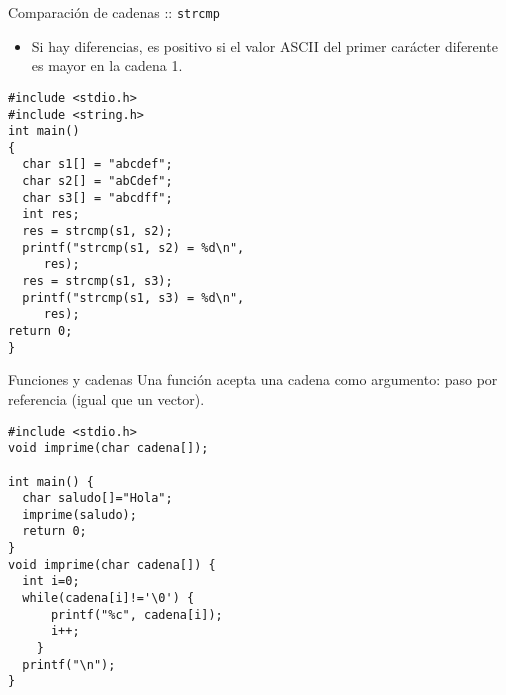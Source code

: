\documentclass[xcolor={usenames,svgnames,dvipsnames}, aspectratio=169]{beamer}
\begin{document}
\begin{frame}[label={sec:orgc81d6ae},fragile]{Comparación de cadenas :: \texttt{strcmp}}
 \begin{itemize}
\item Si hay diferencias, es positivo si el valor ASCII del primer carácter diferente es mayor en la cadena 1.
\end{itemize}

\lstset{language=C,label= ,caption= ,captionpos=b,numbers=none}
\begin{lstlisting}
#include <stdio.h>
#include <string.h>
int main()
{
  char s1[] = "abcdef";
  char s2[] = "abCdef";
  char s3[] = "abcdff";
  int res;
  res = strcmp(s1, s2);
  printf("strcmp(s1, s2) = %d\n",
	 res);
  res = strcmp(s1, s3);
  printf("strcmp(s1, s3) = %d\n",
	 res);
return 0;
}
\end{lstlisting}
\end{frame}

\begin{frame}[label={sec:org475c0f5},fragile]{Funciones y cadenas}
 Una función acepta una cadena como argumento: \alert{paso por referencia} (igual que un vector).

\lstset{language=C,label= ,caption= ,captionpos=b,numbers=none}
\begin{lstlisting}
#include <stdio.h>
void imprime(char cadena[]); 

int main() {
  char saludo[]="Hola";
  imprime(saludo);
  return 0;
}
void imprime(char cadena[]) {
  int i=0;
  while(cadena[i]!='\0') {
      printf("%c", cadena[i]);
      i++;
    }
  printf("\n");
}
\end{lstlisting}
\end{frame}
\end{document}
